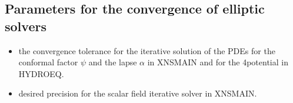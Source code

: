 \documentclass[letterpaper,10pt,english]{sphinxmanual}
\begin{document}
\subsection{Parameters for the convergence of elliptic solvers}
\label{\detokenize{user_params:parameters-for-the-convergence-of-elliptic-solvers}}\begin{itemize}
\item {} 
\sphinxAtStartPar
{} \sphinxhyphen{} the convergence tolerance for the iterative solution of the PDEs for the conformal factor \(\psi\)
and the lapse \(\alpha\) in XNSMAIN and for the 4\sphinxhyphen{}potential in HYDROEQ.


\item {} 
\sphinxAtStartPar
{} \sphinxhyphen{} desired precision for the scalar field iterative solver in XNSMAIN.


\end{itemize}
\end{document}
